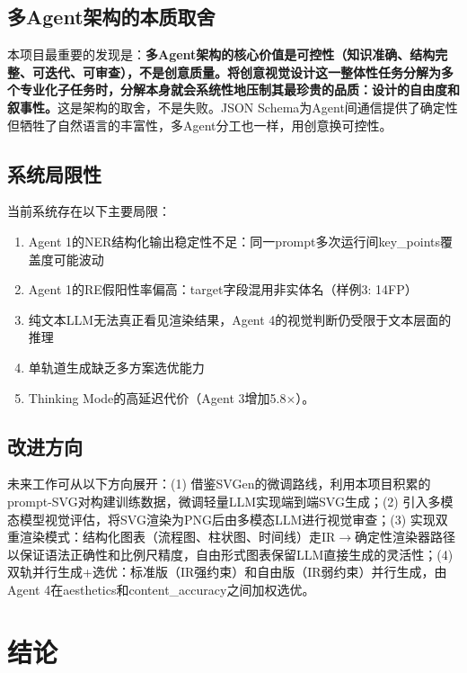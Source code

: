 \documentclass[11pt,a4paper]{article}
\begin{document}
\subsection{多Agent架构的本质取舍}

本项目最重要的发现是：\textbf{多Agent架构的核心价值是可控性（知识准确、结构完整、可迭代、可审查），不是创意质量。将创意视觉设计这一整体性任务分解为多个专业化子任务时，分解本身就会系统性地压制其最珍贵的品质：设计的自由度和叙事性。}这是架构的取舍，不是失败。JSON Schema为Agent间通信提供了确定性但牺牲了自然语言的丰富性，多Agent分工也一样，用创意换可控性。

\subsection{系统局限性}

当前系统存在以下主要局限：

\begin{enumerate}
    \item Agent 1的NER结构化输出稳定性不足：同一prompt多次运行间key\_points覆盖度可能波动
    \item Agent 1的RE假阳性率偏高：target字段混用非实体名（样例3: 14FP）
    \item 纯文本LLM无法真正看见渲染结果，Agent 4的视觉判断仍受限于文本层面的推理
    \item 单轨道生成缺乏多方案选优能力
    \item Thinking Mode的高延迟代价（Agent 3增加5.8$\times$）。
\end{enumerate}

\subsection{改进方向}

未来工作可从以下方向展开：(1) 借鉴SVGen\cite{svgen}的微调路线，利用本项目积累的prompt-SVG对构建训练数据，微调轻量LLM实现端到端SVG生成；(2) 引入多模态模型视觉评估，将SVG渲染为PNG后由多模态LLM进行视觉审查；(3) 实现双重渲染模式：结构化图表（流程图、柱状图、时间线）走IR$\rightarrow$确定性渲染器路径以保证语法正确性和比例尺精度，自由形式图表保留LLM直接生成的灵活性；(4) 双轨并行生成+选优：标准版（IR强约束）和自由版（IR弱约束）并行生成，由Agent 4在aesthetics和content\_accuracy之间加权选优。

\section{结论}
\end{document}
